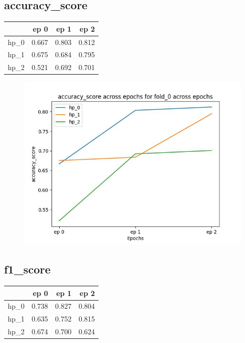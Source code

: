 \documentclass{article}
\begin{document}
\subsection{accuracy\_score}
\begin{tabular}{lrrr}
\toprule
{} &   ep 0 &   ep 1 &   ep 2 \\
\midrule
hp\_0 &  0.667 &  0.803 &  0.812 \\
hp\_1 &  0.675 &  0.684 &  0.795 \\
hp\_2 &  0.521 &  0.692 &  0.701 \\
\bottomrule
\end{tabular}

\begin{figure}[H]
\includegraphics[scale = 0.75]{fold_0/accuracy_score}
\end{figure}
\subsection{f1\_score}
\begin{tabular}{lrrr}
\toprule
{} &   ep 0 &   ep 1 &   ep 2 \\
\midrule
hp\_0 &  0.738 &  0.827 &  0.804 \\
hp\_1 &  0.635 &  0.752 &  0.815 \\
hp\_2 &  0.674 &  0.700 &  0.624 \\
\bottomrule
\end{tabular}
\end{document}
